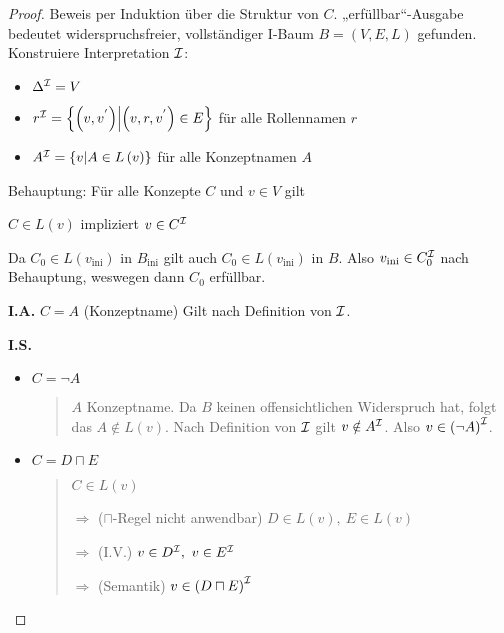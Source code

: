 \begin{proof}

Beweis per Induktion über die Struktur von $C$.
„erfüllbar``-Ausgabe bedeutet widerspruchsfreier, vollständiger I-Baum
$B = \left( V,E,L \right)$ gefunden. Konstruiere Interpretation $\mathcal{I}$:

\begin{itemize}
\item
  $\Delta^{\mathcal{I}} = V$
\item
  $r^{\mathcal{I}} = \left\{ \left( v,v^{'} \right) \middle| \left( v,r,v^{'} \right) \in E \right\}$
  für alle Rollennamen $r$
\item
  $A^{\mathcal{I}} = \left\{ v \middle| A \in L\left( v \right) \right\}$ für
  alle Konzeptnamen $A$
\end{itemize}

Behauptung: Für alle Konzepte $C$ und $v \in V$ gilt

\begin{center}$C \in L\left( v \right)$ impliziert $v \in C^{\mathcal{I}}$\end{center}

Da $C_{0} \in L\left( v_{\text{ini}} \right)$ in $B_{\text{ini}}$ gilt
auch $C_{0} \in L\left( v_{\text{ini}} \right)$ in $B$. Also
$v_{\text{ini}} \in C_{0}^{\mathcal{I}}$ nach Behauptung, weswegen dann
$C_{0}$ erfüllbar.

\textbf{I.A.} $C = A$ (Konzeptname) Gilt nach Definition von
$\mathcal{I}$.

\textbf{I.S.}

\begin{itemize}
\item
  $C = \neg A$

\begin{quote}
$A$ Konzeptname. Da $B$ keinen offensichtlichen Widerspruch hat,
folgt das $A \notin L(v)$. Nach Definition von $\mathcal{I}$ gilt
$v \notin A^{\mathcal{I}}$. Also $v \in \left( \neg A \right)^{\mathcal{I}}$.
\end{quote}

\item
  $C = D \sqcap E$

\begin{quote}
$C \in L\left( v \right)$ 

$\Rightarrow$ ($\sqcap$-Regel nicht anwendbar) $D \in L\left( v \right),\ E \in L\left( v \right)$ 

$\Rightarrow$ (I.V.) $v \in D^{\mathcal{I}},\ v \in E^{\mathcal{I}}$ 

$\Rightarrow$ (Semantik) $v \in \left( D \sqcap E \right)^{\mathcal{I}}$
\end{quote}


\end{itemize}
\end{proof}
